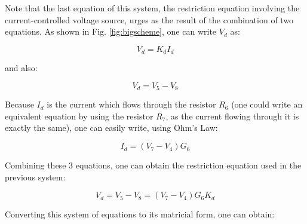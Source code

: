 Note that the last equation of this system, the restriction equation involving the current-controlled voltage source, urges as the result of the combination of two equations. As shown in Fig. \ref{fig:bigscheme}, one can write $V_d$ as:

\begin{equation}
    V_d = K_d I_d
\end{equation}

and also:

\begin{equation}
    V_d = V_5 - V_8
\end{equation}

Because $I_d$ is the current which flows through the resistor $R_6$ (one could write an equivalent equation by using the resistor $R_7$, as the current flowing through it is exactly the same), one can easily write, using Ohm's Law:

\begin{equation}
    I_d = (V_7 - V_4)G_6
\end{equation}

Combining these 3 equations, one can obtain the restriction equation used in the previous system:

\begin{equation}
    V_d = V_5 - V_8 = (V_7 - V_4)G_6 K_d
\end{equation}

Converting this system of equations to its matricial form, one can obtain:

